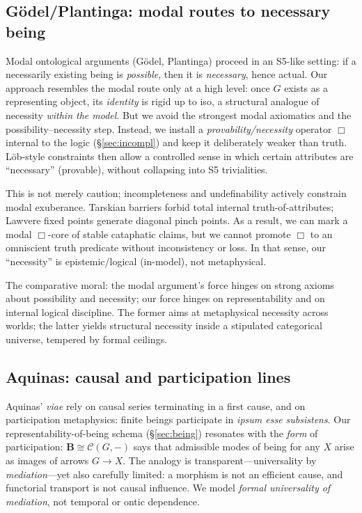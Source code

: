 \documentclass[11pt]{article}
\theoremstyle{upright}
\begin{document}
\subsection{Gödel/Plantinga: modal routes to necessary being}
Modal ontological arguments (Gödel, Plantinga) proceed in an S5-like setting: if a necessarily existing being is \emph{possible}, then it is \emph{necessary}, hence actual. Our approach resembles the modal route only at a high level: once \(G\) exists as a representing object, its \emph{identity} is rigid up to iso, a structural analogue of necessity \emph{within the model}. But we avoid the strongest modal axiomatics and the possibility–necessity step. Instead, we install a \emph{provability/necessity} operator \(\Box\) internal to the logic (\S\ref{sec:incompl}) and keep it deliberately weaker than truth. Löb-style constraints then allow a controlled sense in which certain attributes are “necessary” (provable), without collapsing into S5 trivialities.

This is not merely caution; incompleteness and undefinability actively constrain modal exuberance. Tarskian barriers forbid total internal truth-of-attributes; Lawvere fixed points \citep{Lawvere1969Diagonal} generate diagonal pinch points. As a result, we can mark a modal \(\Box\)-core of stable cataphatic claims, but we cannot promote \(\Box\) to an omniscient truth predicate without inconsistency or loss. In that sense, our “necessity” is epistemic/logical (in-model), not metaphysical.

The comparative moral: the modal argument’s force hinges on strong axioms about possibility and necessity; our force hinges on representability and on internal logical discipline. The former aims at metaphysical necessity across worlds; the latter yields structural necessity inside a stipulated categorical universe, tempered by formal ceilings.

\subsection{Aquinas: causal and participation lines}
Aquinas’ \emph{viae} \citep{Aquinas1920} rely on causal series terminating in a first cause, and on participation metaphysics: finite beings participate in \emph{ipsum esse subsistens}. Our representability-of-being schema (\S\ref{sec:being}) resonates with the \emph{form} of participation: \(\mathbf B\cong \mathcal C(G,-)\) says that admissible modes of being for any \(X\) arise as images of arrows \(G\to X\). The analogy is transparent—universality by \emph{mediation}—yet also carefully limited: a morphism is not an efficient cause, and functorial transport is not causal influence. We model \emph{formal universality of mediation}, not temporal or ontic dependence.
\end{document}
